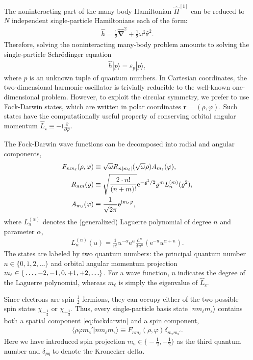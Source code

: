 The noninteracting part of the many-body Hamiltonian $\hat{H}^{[1]}$
can be reduced to $N$ independent single-particle Hamiltonians each of
the form:
\begin{align*}
  \hat{h} = \frac{1}{2} \hat{\bm{\nabla}}^2 + \frac{1}{2} \omega^2 \hat{\bm{r}}^2.
\end{align*}
Therefore, solving the noninteracting many-body problem amounts to solving the single-particle Schr\"odinger equation
\begin{align*}
  \hat{h} |p\rangle = \varepsilon_p |p\rangle,
\end{align*}
where $p$ is an unknown tuple of quantum numbers.  In Cartesian
coordinates, the two-dimensional harmonic oscillator is trivially
reducible to the well-known one-dimensional problem.  However, to
exploit the circular symmetry, we prefer to use Fock-Darwin states,
which are written in polar coordinates $\bm{r} = (\rho, \varphi)$.
Such states have the computationally useful property of conserving
orbital angular momentum $\hat{L}_{\mathrm{z}} \equiv
-\mathrm{i} \frac{\partial}{\partial \varphi}$.

The Fock-Darwin wave functions can be decomposed into radial and angular components,\cite{lohne2010coupled}
\begin{align}
  F_{n m_\ell}(\rho, \varphi) &\equiv \sqrt\omega R_{n |m_\ell|}(\sqrt \omega \rho) A_{m_\ell}(\varphi) \label{eq:fockdarwin}, \\
  R_{n m}(\varrho) &\equiv \sqrt{\frac{2 \cdot n!}{(n + m)!}} \mathrm{e}^{-\varrho^2 / 2} \varrho^m L_n^{(m)}(\varrho^2), \notag \\
  A_{m_\ell}(\varphi) &\equiv \frac{1}{\sqrt{2 \pi}} \mathrm{e}^{\mathrm{i} m_\ell \varphi}, \notag
\end{align}
where $L_n^{(\alpha)}$ denotes the (generalized) Laguerre polynomial \cite{NIST:DLMF} of degree $n$ and parameter $\alpha$,
\begin{align*}
  L_n^{(\alpha)}(u) = \frac{1}{n!} u^{-\alpha} \mathrm{e}^u \frac{\mathrm{d}^n}{\mathrm{d} u^n} (\mathrm{e}^{-u} u^{\alpha + n}).
\end{align*}
The states are labeled by two quantum numbers: the principal quantum
number $n \in \{0, 1, 2, \ldots\}$ and orbital angular momentum
projection $m_\ell \in \mathbb \{\ldots, -2, -1, 0, +1, +2, \ldots\}$.
For a wave function, $n$ indicates the degree of the Laguerre
polynomial, whereas $m_\ell$ is simply the eigenvalue of
$\hat{L}_{\mathrm{z}}$.

Since electrons are spin-$\frac{1}{2}$ fermions, they can occupy
either of the two possible spin states $\chi_{-\frac{1}{2}}$ or
$\chi_{+\frac{1}{2}}$.  Thus, every single-particle basis state $|n
m_\ell m_{\mathrm{s}}\rangle$ contains both a spatial
component \eqref{eq:fockdarwin} and a spin component,
\begin{align} \label{eq:singleparticlestate}
  \langle \rho \varphi m_{\mathrm{s}}' |n m_\ell m_{\mathrm{s}}\rangle \equiv F_{n m_\ell}(\rho, \varphi) \delta_{m_{\mathrm{s}}^{} m_{\mathrm{s}}'}.
\end{align}
Here we have introduced spin projection
$m_{\mathrm{s}} \in \bigl\{-\frac{1}{2}, +\frac{1}{2}\bigr\}$ as the
third quantum number and $\delta_{p q}$ to denote the Kronecker
delta.

